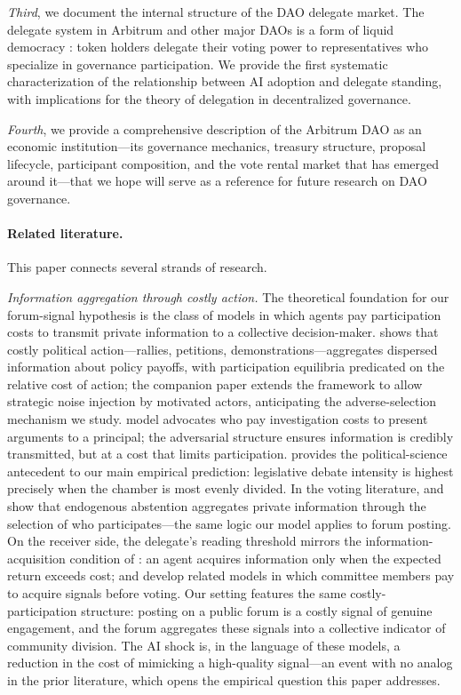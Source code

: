\documentclass[12pt]{article}
\begin{document}
\emph{Third}, we document the internal structure of the DAO delegate market. The
delegate system in Arbitrum and other major DAOs is a form of liquid democracy
\citep{blum2016, green2015}: token holders delegate their voting power to
representatives who specialize in governance participation. We provide the first
systematic characterization of the relationship between AI adoption and delegate
standing, with implications for the theory of delegation in decentralized governance.

\emph{Fourth}, we provide a comprehensive description of the Arbitrum DAO as an
economic institution---its governance mechanics, treasury structure, proposal
lifecycle, participant composition, and the vote rental market that has emerged
around it---that we hope will serve as a reference for future research on DAO
governance.

\paragraph{Related literature.}
This paper connects several strands of research.

\emph{Information aggregation through costly action.} The theoretical foundation for our forum-signal hypothesis is the class of models in which agents pay participation costs to transmit private information to a collective decision-maker. \citet{lohmann1994} shows that costly political action---rallies, petitions, demonstrations---aggregates dispersed information about policy payoffs, with participation equilibria predicated on the relative cost of action; the companion paper \citet{lohmann1993} extends the framework to allow strategic noise injection by motivated actors, anticipating the adverse-selection mechanism we study. \citet{dewatripont1999} model advocates who pay investigation costs to present arguments to a principal; the adversarial structure ensures information is credibly transmitted, but at a cost that limits participation. \citet{austensmith1990} provides the political-science antecedent to our main empirical prediction: legislative debate intensity is highest precisely when the chamber is most evenly divided. In the voting literature, \citet{feddersen1996} and \citet{feddersen1997} show that endogenous abstention aggregates private information through the selection of who participates---the same logic our model applies to forum posting. On the receiver side, the delegate's reading threshold mirrors the information-acquisition condition of \citet{grossman1980}: an agent acquires information only when the expected return exceeds cost; \citet{persico2004} and \citet{gerardi2008} develop related models in which committee members pay to acquire signals before voting. Our setting features the same costly-participation structure: posting on a public forum is a costly signal of genuine engagement, and the forum aggregates these signals into a collective indicator of community division. The AI shock is, in the language of these models, a reduction in the cost of mimicking a high-quality signal---an event with no analog in the prior literature, which opens the empirical question this paper addresses.
\end{document}
